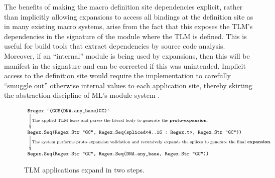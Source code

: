 \documentclass[acmsmall,screen]{acmart}
\newcommand{\li}[1]{\lstinline[basicstyle=\ttfamily\fontsize{9pt}{1em}\selectfont]{#1}}
\begin{document}
The benefits of making the macro definition site dependencies explicit, rather than implicitly allowing expansions to access all bindings at the definition site as in many existing macro systems, arise from the fact that this exposes the TLM's dependencies in the signature of the module where the TLM is defined. This is useful for build tools that extract dependencies by source code analysis. Moreover, if an ``internal'' module is being used by expansions, then this will be manifest in the signature and can be corrected if this was unintended. 
Implicit access to the  definition site would require the implementation to carefully ``smuggle out'' otherwise internal values to each application site, thereby skirting the abstraction discipline of ML's module system \cite{culpepper2005syntactic}.%


\begin{figure}
\vspace{-10px}
\begin{displaymath}
\begin{array}{l}
  \text{\li{$regex `(GC$(DNA.any_base)GC)`}}\\[-10px]
  \xymatrix{
  ~ \ar[d]^{\text{The applied TLM lexes and parses the literal body to generate the \textbf{proto-expansion}.}} \\ ~
  }\\[-5px]
  \text{\li{Regex.Seq(Regex.Str "GC", Regex.Seq(spliced<4..16 : Regex.t>, Regex.Str "GC"))}}\\[-10px]
  \xymatrix{
  ~ \ar[d]^{\text{The system performs proto-expansion validation and recursively expands the splices to generate the final \textbf{expansion}.}} \\ ~
  }\\[-5px]
  \text{\li{Regex.Seq(Regex.Str "GC", Regex.Seq(DNA.any_base, Regex.Str "GC"))}}
\end{array}
\end{displaymath}
\vspace{-4px}
\caption{TLM applications expand in two steps.}
\vspace{-6px}
\label{fig:expansion}
\end{figure}
\end{document}
